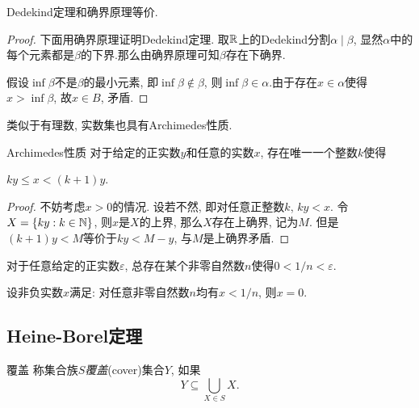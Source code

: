 \begin{proposition}{}
	Dedekind定理和确界原理等价.
\end{proposition}
\begin{proof}
	下面用确界原理证明Dedekind定理. 取$\mathbb{R}$上的Dedekind分割$\alpha \mid \beta$, 显然$\alpha$中的每个元素都是$\beta$的下界.那么由确界原理可知$\beta$存在下确界. 
	
	假设$\inf \beta$不是$\beta$的最小元素, 即$\inf \beta \notin \beta$, 则$\inf \beta \in \alpha$.由于存在$x \in \alpha$使得$x > \inf \beta$, 故$x \in B$, 矛盾. 
\end{proof}

类似于有理数, 实数集也具有Archimedes性质.

\begin{theorem}{Archimedes性质}
	对于给定的正实数$y$和任意的实数$x$, 存在唯一一个整数$k$使得
	\begin{center}
		$ky \leq x < (k+1)y.$
	\end{center}
\end{theorem}
\begin{proof}
	不妨考虑$x>0$的情况. 设若不然, 即对任意正整数$k$, $ky<x$. 令$X=\{ ky:k \in \mathbb{N} \}$, 则$x$是$X$的上界, 那么$X$存在上确界, 记为$M$. 但是$(k+1)y<M$等价于$ky<M-y$, 与$M$是上确界矛盾. 
\end{proof}

\begin{corollary}{}
	对于任意给定的正实数$\varepsilon$, 总存在某个非零自然数$n$使得$0<1/n<\varepsilon$.
\end{corollary}

\begin{corollary}{}
	设非负实数$x$满足: 对任意非零自然数$n$均有$x<1/n$, 则$x=0$.
\end{corollary}

\subsection{Heine-Borel定理}

\begin{definition}{覆盖}
	称集合族$S$\textit{覆盖}(cover)集合$Y$, 如果$$Y \subseteq \bigcup_{X \in S} X.$$
\end{definition}

